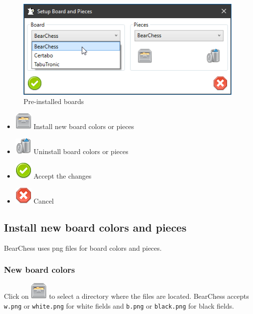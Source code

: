 \documentclass[11pt,a4paper]{article}
\begin{document}
\begin{figure}[H]
	\centering
	\includegraphics[scale=0.9]{SettingsBoardAndPieces4.png}
	\caption{Pre-installed boards}
	\label{fig:SettingsBoardAndPieces4}
\end{figure}


\begin{itemize}
	\item \includegraphics[scale=0.5]{file_manager.png} Install new board colors or pieces
	\item \includegraphics[scale=0.5]{bin.png} Uninstall board colors or pieces
	\item \includegraphics[scale=0.5]{accept_button.png} Accept the changes
	\item \includegraphics[scale=0.5]{cancel.png} Cancel
\end{itemize}




\subsection{Install new board colors and pieces}
BearChess uses png files for board colors and pieces.

\subsubsection{New board colors}
Click on \includegraphics[scale=0.5]{file_manager.png} to select a directory where the files are located. BearChess accepts \verb|w.png| or \verb|white.png| for white fields and \verb|b.png| or \verb|black.png| for black fields.
\end{document}
